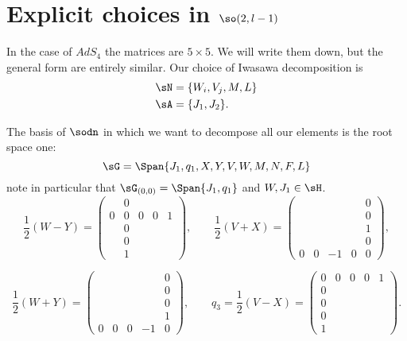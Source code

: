 
\section{Explicit choices in \texorpdfstring{$\so(2,l-1)$}{so2l-1}}

In the case of $AdS_4$ the matrices are $5\times 5$. We will write them down, but the general form are entirely similar. Our choice of Iwasawa decomposition is
\begin{subequations}
\begin{align}
\sN&=\{W_i,V_j,M,L\}\\
\sA&=\{ J_1, J_2\}.
\end{align}
\end{subequations}


The basis of $\sodn$ in which we want to decompose all our elements is the root space one:
\begin{equation}
\sG=\Span\{J_1,q_1,X,Y,V,W,M,N,F,L\}
\end{equation}
note in particular that $\sG_{(0,0)}=\Span\{J_1,q_1\}$ and $W,J_1\in\sH$.
\begin{equation}
\frac{1}{2}(W-Y)=
\begin{pmatrix}
&0\\
0&0&0&0&1\\
&0\\
&0\\
&1
\end{pmatrix},
\qquad
\frac{1}{2}(V+X)=
\begin{pmatrix}
&&&&0\\
&&&&0\\
&&&&1\\
&&&&0\\
0&0&-1&0&0
\end{pmatrix},
\end{equation}



\begin{equation}
\frac{1}{2}(W+Y)=
\begin{pmatrix}
&&&&0\\
&&&&0\\
&&&&0\\
&&&&1\\
0&0&0&-1&0
\end{pmatrix},
\qquad
q_3=\frac{1}{2}(V-X)=
\begin{pmatrix}
0&0&0&0&1\\
0\\
0\\
0\\
1
\end{pmatrix}.
\end{equation}


